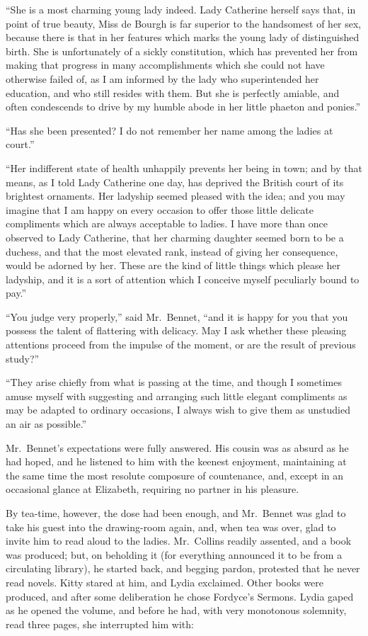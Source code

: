 \documentclass[12pt,english,oneside]{book}
\begin{document}
{}``She is a most charming young lady indeed. Lady Catherine herself
says that, in point of true beauty, Miss de Bourgh is far superior
to the handsomest of her sex, because there is that in her features
which marks the young lady of distinguished birth. She is unfortunately
of a sickly constitution, which has prevented her from making that
progress in many accomplishments which she could not have otherwise
failed of, as I am informed by the lady who superintended her education,
and who still resides with them. But she is perfectly amiable, and
often condescends to drive by my humble abode in her little phaeton
and ponies.''

{}``Has she been presented? I do not remember her name among the
ladies at court.''

{}``Her indifferent state of health unhappily prevents her being
in town; and by that means, as I told Lady Catherine one day, has
deprived the British court of its brightest ornaments. Her ladyship
seemed pleased with the idea; and you may imagine that I am happy
on every occasion to offer those little delicate compliments which
are always acceptable to ladies. I have more than once observed to
Lady Catherine, that her charming daughter seemed born to be a duchess,
and that the most elevated rank, instead of giving her consequence,
would be adorned by her. These are the kind of little things which
please her ladyship, and it is a sort of attention which I conceive
myself peculiarly bound to pay.''

{}``You judge very properly,'' said Mr.\ Bennet, {}``and it is
happy for you that you possess the talent of flattering with delicacy.
May I ask whether these pleasing attentions proceed from the impulse
of the moment, or are the result of previous study?''\ 

{}``They arise chiefly from what is passing at the time, and though
I sometimes amuse myself with suggesting and arranging such little
elegant compliments as may be adapted to ordinary occasions, I always
wish to give them as unstudied an air as possible.''

Mr.\ Bennet's expectations were fully answered. His cousin was as
absurd as he had hoped, and he listened to him with the keenest enjoyment,
maintaining at the same time the most resolute composure of countenance,
and, except in an occasional glance at Elizabeth, requiring no partner
in his pleasure.

By tea-time, however, the dose had been enough, and Mr.\ Bennet was
glad to take his guest into the drawing-room again, and, when tea
was over, glad to invite him to read aloud to the ladies. Mr.\ Collins
readily assented, and a book was produced; but, on beholding it (for
everything announced it to be from a circulating library), he started
back, and begging pardon, protested that he never read novels. Kitty
stared at him, and Lydia exclaimed. Other books were produced, and
after some deliberation he chose Fordyce's Sermons. Lydia gaped as
he opened the volume, and before he had, with very monotonous solemnity,
read three pages, she interrupted him with:
\end{document}

